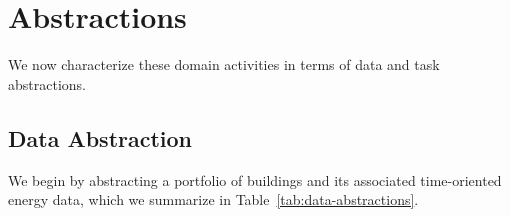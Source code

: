 \documentclass[journal]{vgtc}                %
\begin{document}

\section{Abstractions}
\label{abstractions}



We now characterize these domain activities in terms of data and task abstractions.


\subsection{Data Abstraction}
\label{data-abstractions}


We begin by abstracting a portfolio of buildings and its associated time-oriented energy data, which we summarize in Table~\ref{tab:data-abstractions}.
\end{document}
